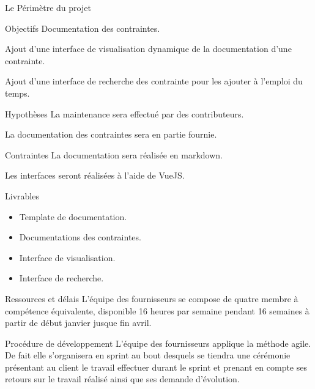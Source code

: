 \documentclass[]{article}
\begin{document}
    \begin{section}{Le Périmètre du projet}
        \begin{subsection}{Objectifs}
            Documentation des contraintes.

            Ajout d’une interface de visualisation dynamique de la documentation d’une contrainte.

            Ajout d’une interface de recherche des contrainte pour les ajouter à l’emploi du temps.
        \end{subsection}

        \begin{subsection}{Hypothèses}
            La maintenance sera effectué par des contributeurs.

            La documentation des contraintes sera en partie fournie.
        \end{subsection}

        \begin{subsection}{Contraintes}
            La documentation sera réalisée en markdown.

            Les interfaces seront réalisées à l’aide de VueJS.
        \end{subsection}

        \begin{subsection}{Livrables}
            \begin{itemize}
                \item Template de documentation.
                \item Documentations des contraintes.
                \item Interface de visualisation.
                \item Interface de recherche.
            \end{itemize}
        \end{subsection}

        \begin{subsection}{Ressources et délais}
            L’équipe des fournisseurs se compose de quatre membre à compétence équivalente, disponible 16 heures par semaine 
            pendant 16 semaines à partir de début janvier jusque fin avril.           
        \end{subsection}

        \begin{subsection}{Procédure de développement}
            L’équipe des fournisseurs applique la méthode agile. De fait elle s’organisera en sprint au bout desquels se tiendra 
            une cérémonie présentant au client le travail effectuer durant le sprint et prenant en compte ses retours sur le 
            travail réalisé ainsi que ses demande d’évolution.


\end{subsection}
\end{section}
\end{document}
